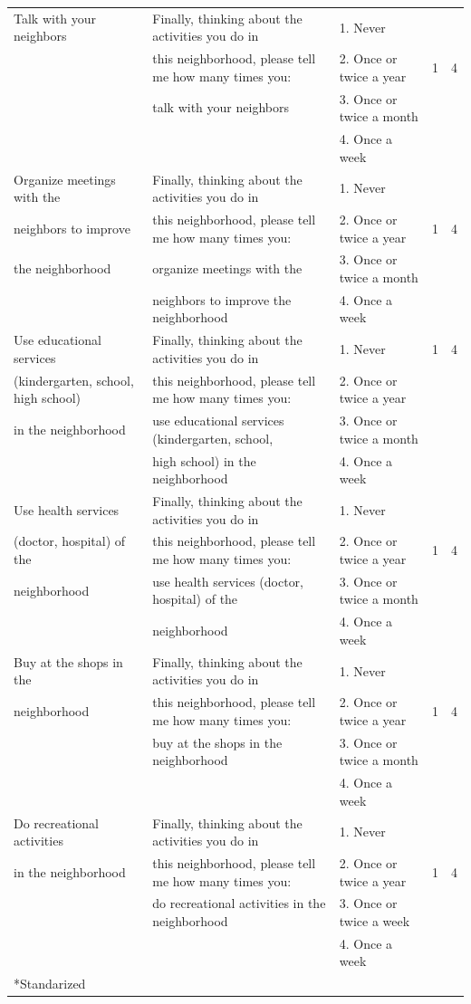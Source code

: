 \documentclass[11pt]{article}
\begin{document}
\begin{landscape}
\begin{tiny}
\begin{tabular}{lllcc}
Talk with your neighbors	&	Finally, thinking about the activities you do in 	&	1. Never	&		&		\\
	&	this neighborhood, please tell me how many times you:	&	2. Once or twice a year	&	1	&	4	\\
	&	talk with your neighbors	&	3. Once or twice a month	&		&		\\
	&		&	4. Once a week	&		&		\\
Organize meetings with the 	&	Finally, thinking about the activities you do in 	&	1. Never	&		&		\\
neighbors to improve 	&	this neighborhood, please tell me how many times you:	&	2. Once or twice a year	&	1	&	4	\\
the neighborhood	&	organize meetings with the 	&	3. Once or twice a month	&		&		\\
	&	neighbors to improve the neighborhood	&	4. Once a week	&		&		\\
Use educational services 	&	Finally, thinking about the activities you do in 	&	1. Never	&	1	&	4	\\
(kindergarten, school, high school)	&	this neighborhood, please tell me how many times you:	&	2. Once or twice a year	&		&		\\
 in the neighborhood	&	use educational services (kindergarten, school, 	&	3. Once or twice a month	&		&		\\
	&	high school) in the neighborhood	&	4. Once a week	&		&		\\
Use health services 	&	Finally, thinking about the activities you do in 	&	1. Never	&		&		\\
(doctor, hospital) of the	&	this neighborhood, please tell me how many times you:	&	2. Once or twice a year	&	1	&	4	\\
neighborhood	&	use health services (doctor, hospital) of the	&	3. Once or twice a month	&		&		\\
	&	neighborhood	&	4. Once a week	&		&		\\
Buy at the shops in the 	&	Finally, thinking about the activities you do in 	&	1. Never	&		&		\\
neighborhood	&	this neighborhood, please tell me how many times you:	&	2. Once or twice a year	&	1	&	4	\\
	&	buy at the shops in the neighborhood	&	3. Once or twice a month	&		&		\\
	&		&	4. Once a week	&		&		\\
Do recreational activities 	&	Finally, thinking about the activities you do in 	&	1. Never	&		&		\\
in the neighborhood	&	this neighborhood, please tell me how many times you:	&	2. Once or twice a year	&	1	&	4	\\
	&	do recreational activities in the neighborhood	&	3. Once or twice a week	&		&		\\
	&		&	4. Once a week	&		&		\\\hline
*Standarized
\end{tabular}
\end{tiny}

\end{landscape}
\restoregeometry
\end{document}
